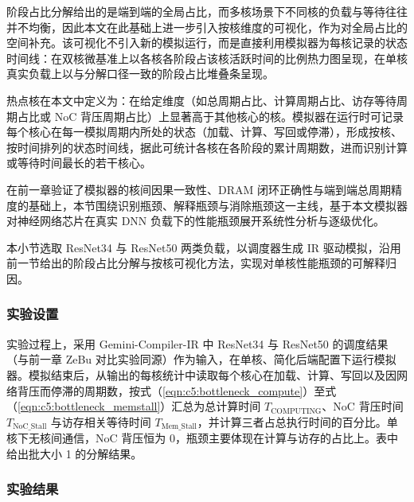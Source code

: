 \label{subsec:c4_percore}

阶段占比分解给出的是端到端的全局占比，而多核场景下不同核的负载与等待往往并不均衡，因此本文在此基础上进一步引入按核维度的可视化，作为对全局占比的空间补充。该可视化不引入新的模拟运行，而是直接利用模拟器为每核记录的状态时间线：在双核微基准上以各核各阶段占该核活跃时间的比例热力图呈现，在单核真实负载上以与分解口径一致的阶段占比堆叠条呈现。

热点核在本文中定义为：在给定维度（如总周期占比、计算周期占比、访存等待周期占比或 NoC 背压周期占比）上显著高于其他核心的核。模拟器在运行时可记录每个核心在每一模拟周期内所处的状态（加载、计算、写回或停滞），形成按核、按时间排列的状态时间线，据此可统计各核在各阶段的累计周期数，进而识别计算或等待时间最长的若干核心。

\label{sec:c4_bottleneck}

在前一章验证了模拟器的核间因果一致性、DRAM 闭环正确性与端到端总周期精度的基础上，本节围绕识别瓶颈、解释瓶颈与消除瓶颈这一主线，基于本文模拟器对神经网络芯片在真实 DNN 负载下的性能瓶颈展开系统性分析与逐级优化。

\label{subsec:c4_singlecore}\label{subsec:c5_singlecore}

本小节选取 ResNet34 与 ResNet50 两类负载，以调度器生成 IR 驱动模拟，沿用前一节给出的阶段占比分解与按核可视化方法，实现对单核性能瓶颈的可解释归因。

\subsubsection{实验设置}

实验过程上，采用 Gemini-Compiler-IR 中 ResNet34 与 ResNet50 的调度结果（与前一章 ZeBu 对比实验同源）作为输入，在单核、简化后端配置下运行模拟器。模拟结束后，从输出的每核统计中读取每个核心在加载、计算、写回以及因网络背压而停滞的周期数，按式（\ref{eqn:c5:bottleneck_compute}）至式（\ref{eqn:c5:bottleneck_memstall}）汇总为总计算时间 $T_\text{COMPUTING}$、NoC 背压时间 $T_\text{NoC\_Stall}$ 与访存相关等待时间 $T_\text{Mem\_Stall}$，并计算三者占总执行时间的百分比。单核下无核间通信，NoC 背压恒为 0，瓶颈主要体现在计算与访存的占比上。表中给出批大小 1 的分解结果。

\subsubsection{实验结果}

